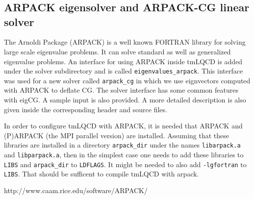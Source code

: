 \documentclass[a4paper,10pt]{article}
\title{}
\author{}
\begin{document}
\maketitle

\begin{abstract}

\end{abstract}

\section{}

\subsection{ARPACK eigensolver and ARPACK-CG linear solver}
The Arnoldi Package (ARPACK) \cite{arpack-page} is a well known FORTRAN library for solving large scale eigenvalue problems. It can solve standard as well as generalized
eigenvalue problems. An interface for using ARPACK inside tmLQCD is added under the solver subdirectory and is called {\tt eigenvalues\_arpack}. This interface was used
for a new solver called {\tt arpack\_cg} in which we use eignvectors computed with ARPACK to deflate CG. The solver interface has some common features with eigCG. A sample
input is also provided. A more detailed description is also given inside the corresponding header and source files. 

In order to configure tmLQCD with ARPACK, it is needed that ARPACK and (P)ARPACK (the MPI parallel version) are installed. Assuming that these libraries are installed 
in a directory {\tt arpack\_dir} under the names {\tt libarpack.a} and {\tt libparpack.a}, then in the simplest case one needs to add these libraries to {\tt LIBS} 
and {\tt arpack\_dir} to {\tt LDFLAGS}. It might be needed to also add {\tt -lgfortran} to {\tt LIBS}. That should be sufficent to compile tmLQCD with arpack.



\begin{thebibliography}{999}
 http://www.caam.rice.edu/software/ARPACK/
\end{thebibliography}
\end{document}
